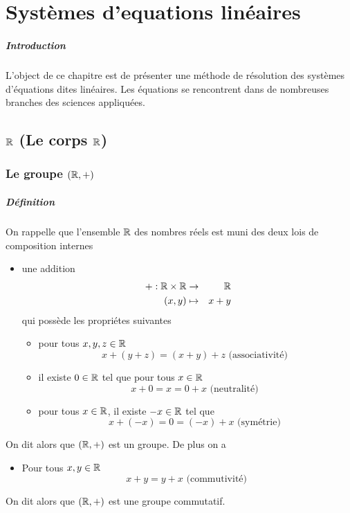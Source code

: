 \chapter{Systèmes d'equations linéaires}

\paragraph{Introduction} L'object de ce chapitre est de présenter une méthode de résolution des systèmes d'équations dites linéaires. Les équations se rencontrent dans de nombreuses branches des sciences appliquées.
%
%
\section{$\mathbb{R}$ (Le corps $\mathbb{R}$)}
%
%
%
\subsection{Le groupe $(\mathbb{R}, +)$}
%
\paragraph{Définition} On rappelle que l'ensemble $\mathbb{R}$ des nombres réels est muni des deux lois de composition internes
\begin{itemize}
  \item une addition 
    \begin{eqnarray*}
      +: \mathbb{R} \times \mathbb{R} &\rightarrow& \mathbb{R} \\
      (x, y) &\mapsto& x+y
    \end{eqnarray*}
    qui possède les propriétes suivantes
    \begin{itemize}
      \item pour tous $x, y, z \in \mathbb{R}$
        $$x + (y + z) = (x + y) + z \text{ (associativité) }$$
      \item il existe $0 \in \mathbb{R}$ tel que pour tous $x \in \mathbb{R}$
        $$x + 0 = x = 0 + x \text{ (neutralité) }$$
      \item pour tous $x \in \mathbb{R}$, il existe $-x \in \mathbb{R}$ tel que
        $$x + (-x) = 0 = (-x) + x \text{ (symétrie) }$$
    \end{itemize}
\end{itemize}
On dit alors que $(\mathbb{R}, +)$ est un groupe. De plus on a
\begin{itemize}
  \item Pour tous $x, y \in \mathbb{R}$
    $$x + y = y + x \text{ (commutivité) }$$
\end{itemize}
On dit alors que $(\mathbb{R}, +)$ est une groupe commutatif.

